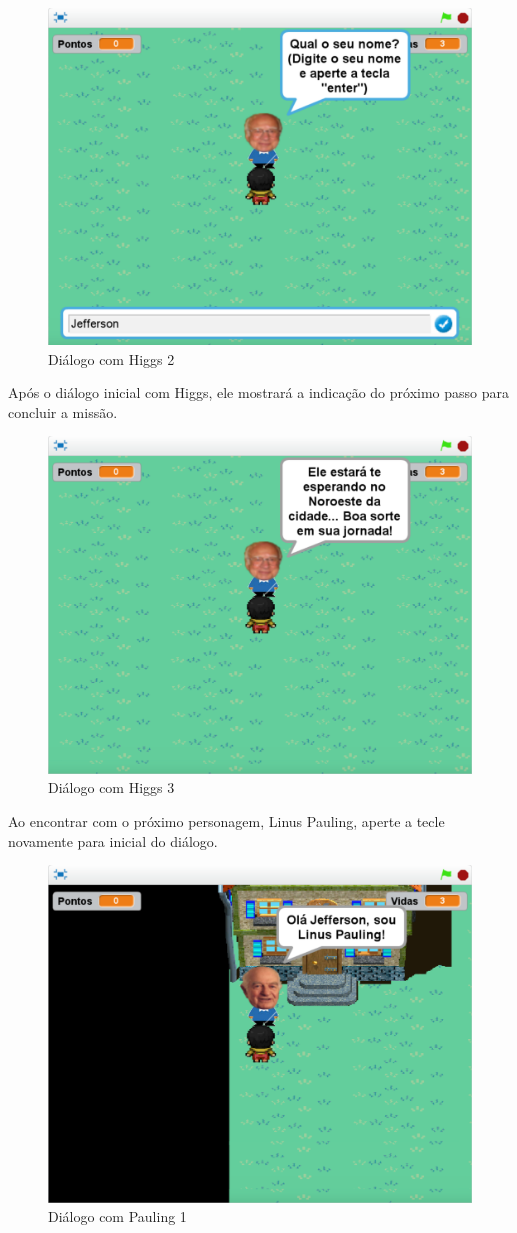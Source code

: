 \documentclass[12pt,fleqn]{book} %
\begin{document}
\begin{figure}[h]
	\centering
	\includegraphics[width=0.65 \textwidth]{Produto/jogo_4}
	\caption{Diálogo com Higgs 2}
	\label{fig:app_a:jogo4}
\end{figure}

Após o diálogo inicial com Higgs, ele mostrará a indicação do próximo passo para concluir a missão.

\begin{figure}[h]
	\centering
	\includegraphics[width=0.65 \textwidth]{Produto/jogo_5}
	\caption{Diálogo com Higgs 3}
	\label{fig:app_a:jogo5}
\end{figure}

\newpage

Ao encontrar com o próximo personagem, Linus Pauling, aperte a tecle novamente  para inicial do diálogo.

\begin{figure}[h]
	\centering
	\includegraphics[width=0.65 \textwidth]{Produto/jogo_6}
	\caption{Diálogo com Pauling 1}
	\label{fig:app_a:jogo6}
\end{figure}
\end{document}

